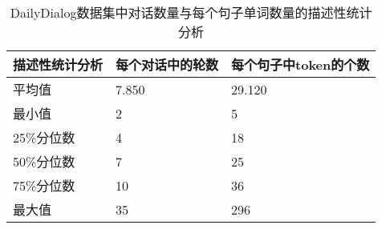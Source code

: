 \begin{table}[!ht]
	\caption{DailyDialog数据集中对话数量与每个句子单词数量的描述性统计分析}
	\label{table:sentenceNum}
	\centering
	\begin{tabularx}{\textwidth}{YYY}
		\toprule
		\textbf{描述性统计分析} & \textbf{每个对话中的轮数} & \textbf{每个句子中token的个数} \\ \midrule
		平均值 & 7.850 & 29.120 \\ 
		最小值 & 2 & 5 \\ 
		25\%分位数 & 4 & 18 \\ 
		50\%分位数 & 7 & 25 \\ 
		75\%分位数 & 10 & 36 \\ 
		最大值 & 35 & 296 \\ \bottomrule
	\end{tabularx}
\end{table}
